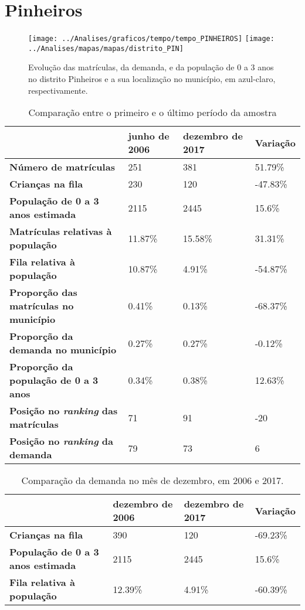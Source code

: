 \section{Pinheiros}
\begin{figure}[H]
\centering
\texttt{[image: ../Analises/graficos/tempo/tempo\_PINHEIROS]}
\texttt{[image: ../Analises/mapas/mapas/distrito\_PIN]}
\caption{Evolução das matrículas, da demanda, e da população de 0 a 3 anos no distrito Pinheiros e a sua localização no município, em azul-claro, respectivamente.}
\end{figure}
\begin{table}[H]
\begin{tabular}{l|l|l|l}
\textbf{}                                      & \textbf{junho de 2006}       & \textbf{dezembro de 2017}    & \textbf{Variação} \\ \hline
\textbf{Número de matrículas}                  & 251 & 381 & 51.79\% \\ \hline
\textbf{Crianças na fila}                      & 230 & 120 & -47.83\% \\ \hline
\textbf{População de 0 a 3 anos estimada}      & 2115 & 2445 & 15.6\% \\ \hline
\textbf{Matrículas relativas à população}      & 11.87\% & 15.58\% & 31.31\% \\ \hline
\textbf{Fila relativa à população}             & 10.87\% & 4.91\% & -54.87\% \\ \hline
\textbf{Proporção das matrículas no município} & 0.41\% & 0.13\% & -68.37\% \\ \hline
\textbf{Proporção da demanda no município}     & 0.27\% & 0.27\% & -0.12\% \\ \hline
\textbf{Proporção da população de 0 a 3 anos}  & 0.34\% & 0.38\% & 12.63\% \\ \hline
\textbf{Posição no \textit{ranking} das matrículas}     & 71 & 91 & -20 \\ \hline
\textbf{Posição no \textit{ranking} da demanda}         & 79 & 73 & 6 \\ 
\end{tabular}
\caption{Comparação entre o primeiro e o último período da amostra}
\end{table}
\begin{table}[H]
\begin{tabular}{l|l|l|l}
\textbf{}                                 & \textbf{dezembro de 2006} & \textbf{dezembro de 2017} & \textbf{Variação} \\ \hline
\textbf{Crianças na fila}                      & 390 & 120 & -69.23\% \\ \hline
\textbf{População de 0 a 3 anos estimada}      & 2115 & 2445 & 15.6\% \\ \hline
\textbf{Fila relativa à população}             & 12.39\% & 4.91\% & -60.39\% \\
\end{tabular}
\caption{Comparação da demanda no mês de dezembro, em 2006 e 2017.}
\end{table}
